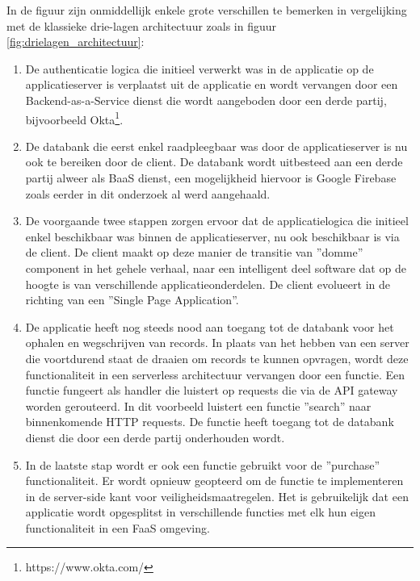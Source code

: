 In de figuur zijn onmiddellijk enkele grote verschillen te bemerken in vergelijking met de klassieke drie-lagen architectuur zoals in figuur \ref{fig:drielagen_architectuur}:
\begin{enumerate}
    \item De authenticatie logica die initieel verwerkt was in de applicatie op de applicatieserver is verplaatst uit de applicatie en wordt vervangen door een Backend-as-a-Service dienst die wordt aangeboden door een derde partij, bijvoorbeeld Okta\footnote{https://www.okta.com/}.
    \item De databank die eerst enkel raadpleegbaar was door de applicatieserver is nu ook te bereiken door de client. De databank wordt uitbesteed aan een derde partij alweer als BaaS dienst, een mogelijkheid hiervoor is Google Firebase zoals eerder in dit onderzoek al werd aangehaald.
    \item De voorgaande twee stappen zorgen ervoor dat de applicatielogica die initieel enkel beschikbaar was binnen de applicatieserver, nu ook beschikbaar is via de client. De client maakt op deze manier de transitie van ''domme'' component in het gehele verhaal, naar een intelligent deel software dat op de hoogte is van verschillende applicatieonderdelen. De client evolueert in de richting van een ''Single Page Application''. 
    \item De applicatie heeft nog steeds nood aan toegang tot de databank voor het ophalen en wegschrijven van records. In plaats van het hebben van een server die voortdurend staat de draaien om records te kunnen opvragen, wordt deze functionaliteit in een serverless architectuur vervangen door een functie. Een functie fungeert als handler die luistert op requests die via de API gateway worden gerouteerd. In dit voorbeeld luistert een functie ''search'' naar binnenkomende HTTP requests. De functie heeft toegang tot de databank dienst die door een derde partij onderhouden wordt.
    \item In de laatste stap wordt er ook een functie gebruikt voor de ''purchase'' functionaliteit. Er wordt opnieuw geopteerd om de functie te implementeren in de server-side kant voor veiligheidsmaatregelen. Het is gebruikelijk dat een applicatie wordt opgesplitst in verschillende functies met elk hun eigen functionaliteit in een FaaS omgeving.
\end{enumerate}

